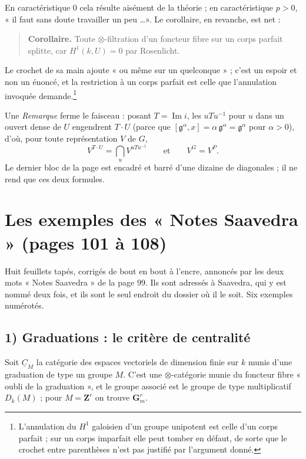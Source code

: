 \documentclass[11pt,a4paper]{article}
\begin{document}
En caractéristique $0$ cela résulte aisément de la théorie ; en
caractéristique $p > 0$, « il faut sans doute travailler un peu \ldots ». Le
corollaire, en revanche, est net :
\begin{quote}
\textbf{Corollaire.} Toute $\otimes$-filtration d'un foncteur fibre sur un
corps parfait splitte, car $H^{1}(k, U) = 0$ par Rosenlicht.
\end{quote}
Le crochet de sa main ajoute « ou même sur un quelconque » ; c'est un espoir et
non un énoncé, et la restriction à un corps parfait est celle que l'annulation
invoquée demande.\footnote{L'annulation du $H^{1}$ galoisien d'un groupe
unipotent est celle d'un corps parfait ; sur un corps imparfait elle peut
tomber en défaut, de sorte que le crochet entre parenthèses n'est pas
justifié par l'argument donné.}

Une \emph{Remarque} ferme le faisceau : posant $T = \operatorname{Im}i$, les
$uTu^{-1}$ pour $u$ dans un ouvert dense de $U$ engendrent $T \cdot U$
(parce que $[\mathfrak{g}^{\alpha}, x] = \alpha\,\mathfrak{g}^{\alpha} =
\mathfrak{g}^{\alpha}$ pour $\alpha > 0$), d'où, pour toute représentation
$V$ de $G$,
\[
V^{T \cdot U} = \bigcap_{u}V^{uTu^{-1}}
\qquad\text{et}\qquad
V^{G} = V^{P} .
\]
Le dernier bloc de la page est encadré et barré d'une dizaine de diagonales ;
il ne rend que ces deux formules.

\section*{Les exemples des « Notes Saavedra » (pages 101 à 108)}

Huit feuillets tapés, corrigés de bout en bout à l'encre, annoncés par les deux
mots « Notes Saavedra » de la page 99. Ils sont adressés à Saavedra, qui y est
nommé deux fois, et ils sont le seul endroit du dossier où il le soit. Six
exemples numérotés.

\subsection*{1) Graduations : le critère de centralité}

Soit $\underline{C}_{M}$ la catégorie des espaces vectoriels de dimension finie
sur $k$ munis d'une graduation de type un groupe $M$. C'est une
$\otimes$-catégorie munie du foncteur fibre « oubli de la graduation », et le
groupe associé est le groupe de type multiplicatif $D_{k}(M)$ ; pour $M =
\mathbf{Z}^{r}$ on trouve $\mathbf{G}_{m}^{r}$.
\end{document}
